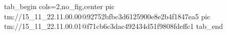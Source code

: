  
 
 
 
 

\qqSecOrig


\ifcmt
  tab_begin cols=2,no_fig,center
    pic tm://15_11_22.11.00.00@92752bfbc3d6125900e8e2b4f1847ea5
    pic tm://15_11_22.11.00.01@f71cb6c3dac492434d51f9808fdeffc1
  tab_end
\fi

